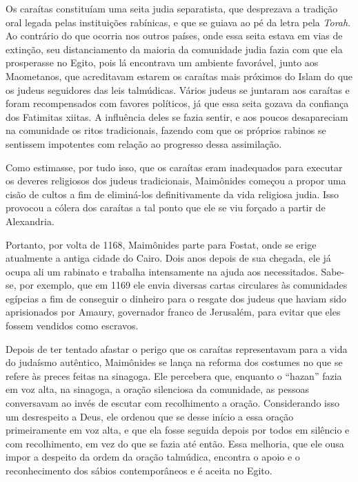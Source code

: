 Os caraítas constituíam uma seita judia separatista, que desprezava a
tradição oral legada pelas instituições rabínicas, e que se guiava ao pé
da letra pela \emph{Torah}. Ao contrário do que ocorria nos outros
países, onde essa seita estava em vias de extinção, seu distanciamento
da maioria da comunidade judia fazia com que ela prosperasse no Egito, pois lá encontrava um ambiente
favorável, junto aos Maometanos, que acreditavam estarem os caraítas
mais próximos do Islam do que os judeus seguidores das leis talmúdicas.
Vários judeus se juntaram aos caraítas e foram recompensados com favores
políticos, já que essa seita gozava da confiança dos Fatimitas xiitas. A
influência deles se fazia sentir, e aos poucos desapareciam na
comunidade os ritos tradicionais, fazendo com que os próprios rabinos
se sentissem impotentes com relação ao progresso dessa assimilação.

Como estimasse, por tudo isso, que os caraítas eram inadequados para
executar os deveres religiosos dos judeus tradicionais, Maimônides
começou a propor uma cisão de cultos a fim de eliminá-los
definitivamente da vida religiosa judia. Isso provocou a cólera dos
caraítas a tal ponto que ele se viu forçado a partir de Alexandria.

Portanto, por volta de 1168, Maimônides parte para Fostat, onde se erige
atualmente a antiga cidade do Cairo. Dois anos depois de sua chegada,
ele já ocupa ali um rabinato e trabalha intensamente na ajuda aos
necessitados. Sabe-se, por exemplo, que em 1169 ele envia diversas
cartas circulares às comunidades egípcias a fim de conseguir o dinheiro
para o resgate dos judeus que haviam sido aprisionados por Amaury,
governador franco de Jerusalém, para evitar que eles fossem vendidos
como escravos.

Depois de ter tentado afastar o perigo que os caraítas representavam
para a vida do judaísmo autêntico, Maimônides se lança na reforma dos
costumes no que se refere às preces feitas na sinagoga. Ele percebera
que, enquanto o ``hazan'' fazia em voz alta, na sinagoga, a oração
silenciosa da comunidade, as pessoas conversavam ao invés de escutar com
recolhimento a oração. Considerando isso um desrespeito a Deus, ele
ordenou que se desse início a essa oração primeiramente em voz alta, e
que ela fosse seguida depois por todos em silêncio e com recolhimento,
em vez do que se fazia até então. Essa melhoria, que ele ousa impor a
despeito da ordem da oração talmúdica, encontra o apoio e o
reconhecimento dos sábios contemporâneos e é aceita no Egito.

